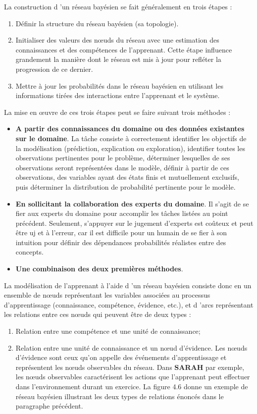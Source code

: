 \begin{description}
La construction d 'un réseau bayésien se fait généralement en trois étapes : 
\begin{enumerate}
\item  Définir la structure du réseau bayésien (sa topologie). 
\item  Initialiser des valeurs des nœuds du réseau avec une estimation des connaissances et des compétences de l'apprenant. Cette étape influence grandement la manière dont le réseau est mis à jour pour refléter la progression de ce dernier.
\item Mettre à jour les probabilités dans le réseau bayésien en utilisant les informations tirées des interactions entre l'apprenant et le système.
\end{enumerate}
La mise en œuvre de ces trois étapes peut se faire suivant trois méthodes : 

\begin{itemize}
\item \textbf{A partir des connaissances du domaine ou des données existantes sur le domaine}. La tâche consiste à correctement identifier les objectifs de la modélisation (prédiction, explication ou exploration), identifier toutes les observations pertinentes pour le problème, déterminer lesquelles de ses observations seront représentées dans le modèle, définir à partir de ces observations, des variables ayant des états finis et mutuellement exclusifs, puis déterminer la distribution de probabilité pertinente pour le modèle.
\item \textbf{En sollicitant la collaboration des experts du domaine}. Il s'agit de se fier aux experts du domaine pour accomplir les tâches listées au point précédent. Seulement, s'appuyer sur le jugement d'experts est coûteux et peut être uj et à l'erreur, car il est difficile pour un humain de se fier à son intuition pour définir des dépendances probabilités réalistes entre des concepts. 
\item \textbf{Une combinaison des deux premières méthodes}.
\end{itemize}

 La modélisation de l'apprenant à l'aide d 'un réseau bayésien consiste donc en un ensemble de nœuds représentant les variables associées au processus d'apprentissage (connaissance, compétence, évidence, etc.), et d 'arcs représentant les relations entre ces nœuds qui peuvent être de deux types  : 
\begin{enumerate}
\item Relation entre une compétence et une unité de connaissance;
\item Relation entre une unité de connaissance et un nœud d'évidence. Les nœuds d'évidence sont ceux qu'on appelle des événements d'apprentissage et représentent les nœuds observables du réseau. Dans  \textbf{SARAH} par exemple, les nœuds observables caractérisent les actions que l'apprenant peut effectuer dans l'environnement durant un exercice. La figure 4.6   donne un exemple de réseau bayésien illustrant les deux types de relations énoncés dans le paragraphe précédent.\\\
\end{enumerate}


\end{description}
